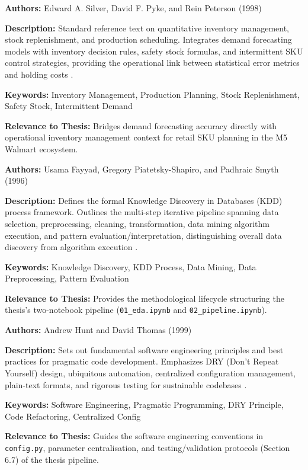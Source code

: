 {

	\textbf{Authors:}
	Edward A. Silver, David F. Pyke, and Rein Peterson (1998)

	\textbf{Description:}
	Standard reference text on quantitative inventory management, stock replenishment, and production scheduling. Integrates demand forecasting models with inventory decision rules, safety stock formulas, and intermittent SKU control strategies, providing the operational link between statistical error metrics and holding costs \autocite{Silver:1998}.

	\textbf{Keywords:}
	Inventory Management, Production Planning, Stock Replenishment, Safety Stock, Intermittent Demand

	\textbf{Relevance to Thesis:}
	Bridges demand forecasting accuracy directly with operational inventory management context for retail SKU planning in the M5 Walmart ecosystem.

}


{

	\textbf{Authors:}
	Usama Fayyad, Gregory Piatetsky-Shapiro, and Padhraic Smyth (1996)

	\textbf{Description:}
	Defines the formal Knowledge Discovery in Databases (KDD) process framework. Outlines the multi-step iterative pipeline spanning data selection, preprocessing, cleaning, transformation, data mining algorithm execution, and pattern evaluation/interpretation, distinguishing overall data discovery from algorithm execution \autocite{Fayyad:1996}.

	\textbf{Keywords:}
	Knowledge Discovery, KDD Process, Data Mining, Data Preprocessing, Pattern Evaluation

	\textbf{Relevance to Thesis:}
	Provides the methodological lifecycle structuring the thesis's two-notebook pipeline (\texttt{01\_eda.ipynb} and \texttt{02\_pipeline.ipynb}).

}

{

	\textbf{Authors:}
	Andrew Hunt and David Thomas (1999)

	\textbf{Description:}
	Sets out fundamental software engineering principles and best practices for pragmatic code development. Emphasizes DRY (Don't Repeat Yourself) design, ubiquitous automation, centralized configuration management, plain-text formats, and rigorous testing for sustainable codebases \autocite{Hunt:1999}.

	\textbf{Keywords:}
	Software Engineering, Pragmatic Programming, DRY Principle, Code Refactoring, Centralized Config

	\textbf{Relevance to Thesis:}
	Guides the software engineering conventions in \texttt{config.py}, parameter centralisation, and testing/validation protocols (Section 6.7) of the thesis pipeline.

}

